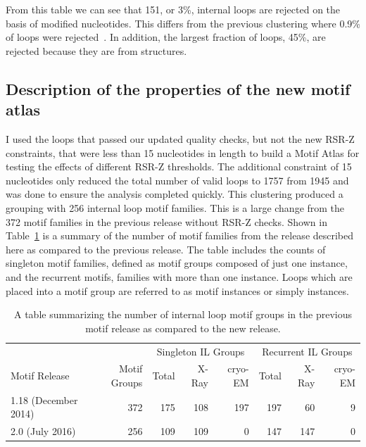 From this table we can see that 151, or 3\%, internal loops are rejected on the
basis of modified nucleotides. This differs from the previous clustering where
0.9\% of loops were rejected~\cite{Petrov2012}. In addition, the largest
fraction of loops, 45\%, are rejected because they are from \cyem{} structures.

\subsection{Description of the properties of the new motif atlas}

I used the loops that passed our updated quality checks, but not the new RSR-Z
constraints, that were less than 15 nucleotides in length to build a Motif Atlas
for testing the effects of different RSR-Z thresholds. The additional constraint
of 15 nucleotides only reduced the total number of valid loops to 1757 from 1945
and was done to ensure the analysis completed quickly. This clustering produced
a grouping with 256 internal loop motif families. This is a large change from
the 372 motif families in the previous release without RSR-Z checks. Shown in
Table~\ref{tab:loop-counts} is a summary of the number of motif families from
the release described here as compared to the previous release. The table
includes the counts of singleton motif families, defined as motif groups
composed of just one instance, and the recurrent motifs, families with more than
one instance. Loops which are placed into a motif group are referred to as motif
instances or simply instances.

\begin{table}
  \begin{tabular}{lrrrrrrr}
    \toprule
                  &                                      & \multicolumn{3}{c}{Singleton IL Groups} & \multicolumn{3}{c}{Recurrent IL Groups} \\
    \cmidrule(r){3-5} \cmidrule(r){6-8}
    Motif Release &
      Motif Groups &
      Total & X-Ray & cryo-EM &
      Total & X-Ray & cryo-EM \\
    \midrule
    1.18 (December 2014) & 372 & 175 & 108 & 197 & 197 & 60  & 9 \\
    2.0 (July 2016)      & 256 & 109 & 109 & 0   & 147 & 147 & 0 \\
    \bottomrule
  \end{tabular}
  \caption{A table summarizing the number of internal loop motif groups in the
  previous motif release as compared to the new release. }
\label{tab:loop-counts}
\end{table}

